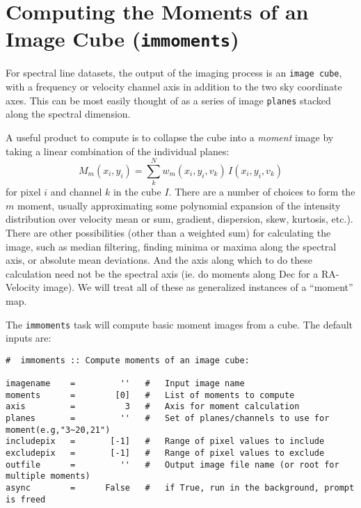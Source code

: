 \section{Computing the Moments of an Image Cube ({\tt immoments})}
\label{section:analysis.moments}

For spectral line datasets, the output of the imaging process is an
{\tt image cube}, with a frequency or velocity channel axis in
addition to the two sky coordinate axes.  This can be most easily
thought of as a series of image {\tt planes} stacked along the
spectral dimension.

A useful product to compute is to collapse the cube into a 
{\it moment} image by taking a linear combination of the individual
planes:
\begin{equation}
   M_m(x_i,y_i) = \sum_k^N w_m(x_i,y_i,v_k)\,I(x_i,y_i,v_k)
\end{equation}
for pixel $i$ and channel $k$ in the cube $I$.  There are a number
of choices to form the $m$ moment, usually approximating some
polynomial expansion of the intensity distribution over velocity
mean or sum, gradient, dispersion, skew, kurtosis, etc.).  There
are other possibilities (other than a weighted sum) for calculating
the image, such as median filtering, finding minima or maxima along
the spectral axis, or absolute mean deviations.  And the axis along
which to do these calculation need not be the spectral axis (ie.
do moments along Dec for a RA-Velocity image).  We will treat all
of these as generalized instances of a ``moment'' map.

The {\tt immoments} task will compute basic moment images from a cube.
The default inputs are:
\small
\begin{verbatim}
#  immoments :: Compute moments of an image cube:

imagename    =         ''   #   Input image name
moments      =        [0]   #   List of moments to compute
axis         =          3   #   Axis for moment calculation
planes       =         ''   #   Set of planes/channels to use for moment(e.g,"3~20,21")
includepix   =       [-1]   #   Range of pixel values to include
excludepix   =       [-1]   #   Range of pixel values to exclude
outfile      =         ''   #   Output image file name (or root for multiple moments)
async        =      False   #   if True, run in the background, prompt is freed
\end{verbatim}
\normalsize

